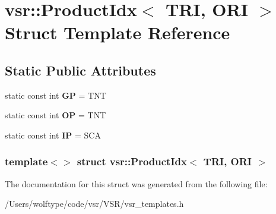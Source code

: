 \hypertarget{structvsr_1_1_product_idx_3_01_t_r_i_00_01_o_r_i_01_4}{\section{vsr\-:\-:Product\-Idx$<$ T\-R\-I, O\-R\-I $>$ Struct Template Reference}
\label{structvsr_1_1_product_idx_3_01_t_r_i_00_01_o_r_i_01_4}
}
\subsection*{Static Public Attributes}
\begin{DoxyCompactItemize}
\item 
\hypertarget{structvsr_1_1_product_idx_3_01_t_r_i_00_01_o_r_i_01_4_ae3208840e95735fab59dde61eb06a96d}{static const int {\bfseries G\-P} = T\-N\-T}\label{structvsr_1_1_product_idx_3_01_t_r_i_00_01_o_r_i_01_4_ae3208840e95735fab59dde61eb06a96d}

\item 
\hypertarget{structvsr_1_1_product_idx_3_01_t_r_i_00_01_o_r_i_01_4_a5705e8d9fc8ff8f3e79f0f333d584ad5}{static const int {\bfseries O\-P} = T\-N\-T}\label{structvsr_1_1_product_idx_3_01_t_r_i_00_01_o_r_i_01_4_a5705e8d9fc8ff8f3e79f0f333d584ad5}

\item 
\hypertarget{structvsr_1_1_product_idx_3_01_t_r_i_00_01_o_r_i_01_4_a0a47e795596c32a215d1c4d952e6fe6c}{static const int {\bfseries I\-P} = S\-C\-A}\label{structvsr_1_1_product_idx_3_01_t_r_i_00_01_o_r_i_01_4_a0a47e795596c32a215d1c4d952e6fe6c}

\end{DoxyCompactItemize}
\subsubsection*{template$<$$>$ struct vsr\-::\-Product\-Idx$<$ T\-R\-I, O\-R\-I $>$}



The documentation for this struct was generated from the following file\-:\begin{DoxyCompactItemize}
\item 
/\-Users/wolftype/code/vsr/\-V\-S\-R/vsr\-\_\-templates.\-h\end{DoxyCompactItemize}
